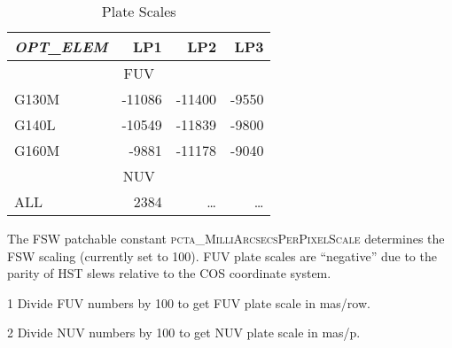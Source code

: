 \begin{center}
\begin{table}[htb!]
\centering
\vspace{-0.1cm}
\footnotesize
	\begin{threeparttable}[tbc]
	\caption[]{ Plate Scales}
	\begin{tabular*}{.75\linewidth}{@{\extracolsep{\fill}}lrrr}
		\toprule
		\textit{OPT\_ELEM} &	LP1	&	LP2	&	LP3	\\
		\toprule
		\multicolumn{4}{c}{FUV\tnote{1}}\\
		\midrule
		G130M &  -11086 &  -11400 &   -9550 \\
		G140L &  -10549 &  -11839 &   -9800 \\
		G160M &   -9881 &  -11178 &   -9040 \\
		\midrule
		\multicolumn{4}{c}{NUV\tnote{2}}\\
		\midrule
			ALL	&	2384	&	\dots	&	\dots \\
		\bottomrule
	\end{tabular*}
	\scriptsize
		\begin{tablenotes}
			\item[] {The FSW patchable constant \textsc{pcta\_MilliArcsecsPerPixelScale} determines the FSW scaling (currently set to 100). FUV plate scales are ``negative'' due to the parity of HST slews relative to the COS coordinate system.\\}
			\item[1] {Divide FUV numbers by 100 to get FUV plate scale in mas/row.}
			\item[2] {Divide NUV numbers by 100 to get NUV plate scale in mas/p. }
		\end{tablenotes}
	\label{tab:FSWplatescales}
	\normalsize
	\end{threeparttable}
\normalsize
\end{table}
\end{center}
